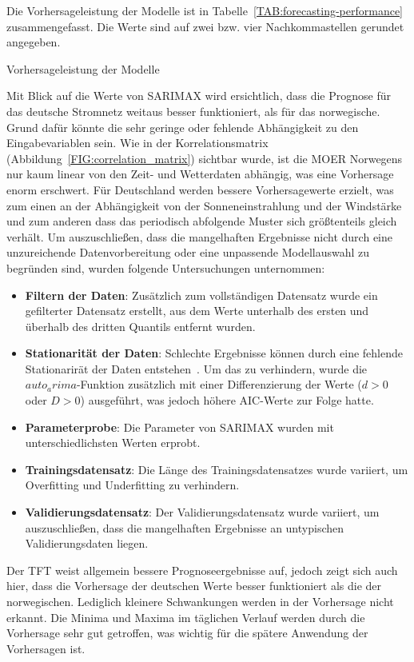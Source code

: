 Die Vorhersageleistung der Modelle ist in Tabelle~\ref{TAB:forecasting-performance} zusammengefasst.
Die Werte sind auf zwei bzw. vier Nachkommastellen gerundet angegeben.
\begin{table}[htbp]
 \centering
 \caption{Vorhersageleistung der Modelle}
 \label{TAB:forecasting-performance}
 
\end{table}
Mit Blick auf die Werte von \ac{SARIMAX} wird ersichtlich, dass die Prognose für das deutsche Stromnetz weitaus besser funktioniert, als für das norwegische.
Grund dafür könnte die sehr geringe oder fehlende Abhängigkeit zu den Eingabevariablen sein.
Wie in der Korrelationsmatrix (Abbildung~\ref{FIG:correlation_matrix}) sichtbar wurde, ist die \ac{MOER} Norwegens nur kaum linear von den Zeit- und Wetterdaten abhängig, was eine Vorhersage enorm erschwert.
Für Deutschland werden bessere Vorhersagewerte erzielt, was zum einen an der Abhängigkeit von der Sonneneinstrahlung und der Windstärke und zum anderen dass das periodisch abfolgende Muster sich größtenteils gleich verhält.
Um auszuschließen, dass die mangelhaften Ergebnisse nicht durch eine unzureichende Datenvorbereitung oder eine unpassende Modellauswahl zu begründen sind, wurden folgende Untersuchungen unternommen:
\begin{itemize}
 \item \textbf{Filtern der Daten}: Zusätzlich zum vollständigen Datensatz wurde ein gefilterter Datensatz erstellt, aus dem Werte unterhalb des ersten und überhalb des dritten Quantils entfernt wurden.
 \item \textbf{Stationarität der Daten}: Schlechte Ergebnisse können durch eine fehlende Stationarirät der Daten entstehen~\cite{}. Um das zu verhindern, wurde die $auto_arima$-Funktion zusätzlich mit einer Differenzierung der Werte ($d > 0$ oder $D > 0$) ausgeführt, was jedoch höhere \ac{AIC}-Werte zur Folge hatte.
 \item \textbf{Parameterprobe}: Die Parameter von \ac{SARIMAX} wurden mit unterschiedlichsten Werten erprobt.
 \item \textbf{Trainingsdatensatz}: Die Länge des Trainingsdatensatzes wurde variiert, um Overfitting und Underfitting zu verhindern.
 \item \textbf{Validierungsdatensatz}: Der Validierungsdatensatz wurde variiert, um auszuschließen, dass die mangelhaften Ergebnisse an untypischen Validierungsdaten liegen.
\end{itemize}

Der \ac{TFT} weist allgemein bessere Prognoseergebnisse auf, jedoch zeigt sich auch hier, dass die Vorhersage der deutschen Werte besser funktioniert als die der norwegischen.
Lediglich kleinere Schwankungen werden in der Vorhersage nicht erkannt.
Die Minima und Maxima im täglichen Verlauf werden durch die Vorhersage sehr gut getroffen, was wichtig für die spätere Anwendung der Vorhersagen ist.

